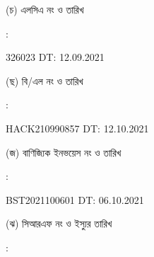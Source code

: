 \documentclass[12pt]{article}
\newcommand{\blno}{HACK210990857}
\newcommand{\bldt}{12.10.2021}
\newcommand{\lcano}{326023}
\newcommand{\lcadt}{12.09.2021}
\newcommand{\invno}{BST2021100601}
\newcommand{\invdt}{06.10.2021}
\begin{document}
\begin{minipage}[t]{0.05\linewidth}
\hspace*{1em}
\end{minipage}
\begin{minipage}[t]{0.45\linewidth}
(চ) এলসিএ নং ও তারিখ
\end{minipage}
\begin{minipage}[t]{0.02\linewidth}
:
\end{minipage}
\begin{minipage}[t]{0.50\linewidth}
{\lcano} \hspace{2em} DT: {\lcadt}
\\
\end{minipage}
\begin{minipage}[t]{0.05\linewidth}
\hspace*{1em}
\end{minipage}
\begin{minipage}[t]{0.45\linewidth}
(ছ) বি/এল নং ও তারিখ
\end{minipage}
\begin{minipage}[t]{0.02\linewidth}
:
\end{minipage}
\begin{minipage}[t]{0.50\linewidth}
{\blno} \hspace{2em} DT: {\bldt}
\\
\end{minipage}
\begin{minipage}[t]{0.05\linewidth}
\hspace*{1em}
\end{minipage}
\begin{minipage}[t]{0.45\linewidth}
(জ) বাণিজ্যিক ইনভয়েস নং ও তারিখ
\end{minipage}
\begin{minipage}[t]{0.02\linewidth}
:
\end{minipage}
\begin{minipage}[t]{0.50\linewidth}
{\invno} \hspace{2em} DT: {\invdt}
\\
\end{minipage}
\begin{minipage}[t]{0.05\linewidth}
\hspace*{1em}
\end{minipage}
\begin{minipage}[t]{0.45\linewidth}
(ঝ) সিআরএফ নং ও ইস্যুর তারিখ
\end{minipage}
\begin{minipage}[t]{0.02\linewidth}
:
\end{minipage}
\end{document}
